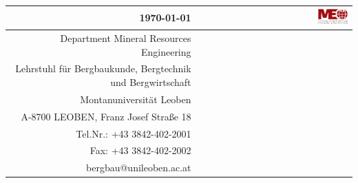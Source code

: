 \begin{titlepage}
\small
\raggedleft
\singlespacing
{}
\begin{tabular}{ r | r }
\today  & \includegraphics[width=0.2\textwidth]{pics/Logo.png}
\\ \hline   
Department Mineral Resources Engineering\\
Lehrstuhl für Bergbaukunde, Bergtechnik und Bergwirtschaft \\ 
Montanuniversität Leoben\\
A-8700 LEOBEN, Franz Josef Straße 18 \\
Tel.Nr.: +43 3842-402-2001\\
Fax: +43 3842-402-2002\\
bergbau@unileoben.ac.at &  
\end{tabular}

\end{titlepage}
